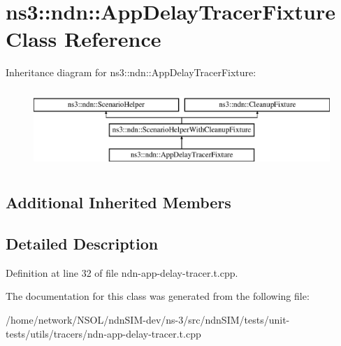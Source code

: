 \hypertarget{classns3_1_1ndn_1_1AppDelayTracerFixture}{}\section{ns3\+:\+:ndn\+:\+:App\+Delay\+Tracer\+Fixture Class Reference}
\label{classns3_1_1ndn_1_1AppDelayTracerFixture}
Inheritance diagram for ns3\+:\+:ndn\+:\+:App\+Delay\+Tracer\+Fixture\+:\begin{figure}[H]
\begin{center}
\leavevmode
\includegraphics[height=3.000000cm]{classns3_1_1ndn_1_1AppDelayTracerFixture}
\end{center}
\end{figure}
\subsection*{Additional Inherited Members}


\subsection{Detailed Description}


Definition at line 32 of file ndn-\/app-\/delay-\/tracer.\+t.\+cpp.



The documentation for this class was generated from the following file\+:\begin{DoxyCompactItemize}
\item 
/home/network/\+N\+S\+O\+L/ndn\+S\+I\+M-\/dev/ns-\/3/src/ndn\+S\+I\+M/tests/unit-\/tests/utils/tracers/ndn-\/app-\/delay-\/tracer.\+t.\+cpp\end{DoxyCompactItemize}
